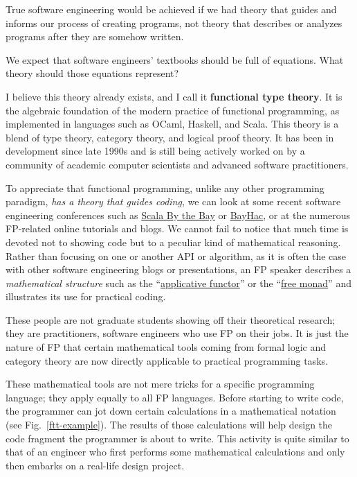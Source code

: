 True software engineering would be achieved if we had theory that
guides and informs our process of creating programs, \textendash{}
not theory that describes or analyzes programs after they are somehow
written.

We expect that software engineers' textbooks should be full of equations.
What theory should those equations represent?

I believe this theory already exists, and I call it \textbf{functional
type theory}. It is the algebraic foundation
of the modern practice of functional programming, as implemented in
languages such as OCaml, Haskell, and Scala. This theory is a blend
of type theory, category theory, and logical proof theory. It has
been in development since late 1990s and is still being actively worked
on by a community of academic computer scientists and advanced software
practitioners.

To appreciate that functional programming, unlike any other programming
paradigm, \emph{has a theory that guides coding}, we can look at some
recent software engineering conferences such as \href{http://2015.scala.bythebay.io/}{Scala By the Bay}
or \href{http://bayhac.org/}{BayHac}, or at the numerous FP-related
online tutorials and blogs. We cannot fail to notice that much time
is devoted not to showing code but to a peculiar kind of mathematical
reasoning. Rather than focusing on one or another API or algorithm,
as it is often the case with other software engineering blogs or presentations,
an FP speaker describes a \emph{mathematical structure} \textendash{}
such as the ``\href{http://www.youtube.com/watch\%3Fv\%3DbmIxIslimVY}{applicative functor}''
or the ``\href{http://www.youtube.com/watch\%3Fv\%3DU0lK0hnbc4U}{free monad}''
\textendash{} and illustrates its use for practical coding.

These people are not graduate students showing off their theoretical
research; they are practitioners, software engineers who use FP on
their jobs. It is just the nature of FP that certain mathematical
tools \textendash{} coming from formal logic and category theory \textendash{}
are now directly applicable to practical programming tasks.

These mathematical tools are not mere tricks for a specific programming
language; they apply equally to all FP languages. Before starting
to write code, the programmer can jot down certain calculations in
a mathematical notation (see Fig.\ \ref{ftt-example}). The results
of those calculations will help design the code fragment the programmer
is about to write. This activity is quite similar to that of an engineer
who first performs some mathematical calculations and only then embarks
on a real-life design project.

